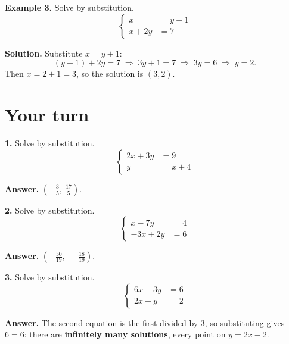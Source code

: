 \documentclass{ximera}
\begin{document}
\begin{problem}

\textbf{Example 3.} Solve by substitution.
\[
  \left\{\begin{aligned}
    x &= y+1 \\
    x+2y &= 7
  \end{aligned}\right.
\]

\begin{hint}
\textbf{Solution.} Substitute $x=y+1$:
\[
  (y+1)+2y=7 \;\Longrightarrow\; 3y+1=7 \;\Longrightarrow\; 3y=6 \;\Longrightarrow\; y=2 .
\]
Then $x=2+1=3$, so the solution is $(3,2)$.
\end{hint}
\end{problem}

\section*{Your turn}

\begin{problem}

\textbf{1.} Solve by substitution.
\[
  \left\{\begin{aligned}
    2x+3y &= 9 \\
    y &= x+4
  \end{aligned}\right.
\]

\begin{hint}
\textbf{Answer.} $\left(-\tfrac{3}{5},\ \tfrac{17}{5}\right)$.
\end{hint}
\end{problem}

\begin{problem}

\textbf{2.} Solve by substitution.
\[
  \left\{\begin{aligned}
    x-7y &= 4 \\
    -3x+2y &= 6
  \end{aligned}\right.
\]

\begin{hint}
\textbf{Answer.} $\left(-\tfrac{50}{19},\ -\tfrac{18}{19}\right)$.
\end{hint}
\end{problem}

\begin{problem}

\textbf{3.} Solve by substitution.
\[
  \left\{\begin{aligned}
    6x-3y &= 6 \\
    2x-y &= 2
  \end{aligned}\right.
\]

\begin{hint}
\textbf{Answer.} The second equation is the first divided by 3, so substituting gives
$6=6$: there are \textbf{infinitely many solutions}, every point on $y=2x-2$.
\end{hint}
\end{problem}
\end{document}
